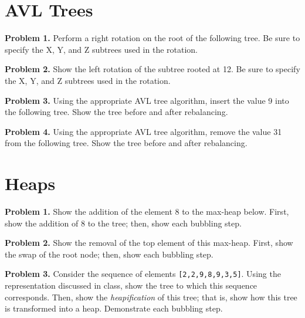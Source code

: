 \documentclass{article}
\begin{document}
\section{AVL Trees}

\noindent \textbf{Problem 1.} Perform a right rotation on the root of the following tree.  Be sure to specify the X, Y, and Z subtrees used in the rotation.


\noindent \textbf{Problem 2.} Show the left rotation of the subtree rooted at 12.  Be sure to specify the X, Y, and Z subtrees used in the rotation.



\noindent \textbf{Problem 3.} Using the appropriate AVL tree algorithm, insert the value 9 into the following tree.  Show the tree before and after rebalancing.



\noindent \textbf{Problem 4.} Using the appropriate AVL tree algorithm, remove the value 31 from the following tree.  Show the tree before and after rebalancing.



\section{Heaps}

\noindent \textbf{Problem 1.} Show the addition of the element 8 to the max-heap below.  First, show the addition of 8 to the tree; then, show each bubbling step.



\noindent \textbf{Problem 2.} Show the removal of the top element of this max-heap.  First, show the swap of the root node; then, show each bubbling step.



\noindent \textbf{Problem 3.} Consider the sequence of elements \texttt{[2,2,9,8,9,3,5]}.  Using the representation discussed in class, show the tree to which this sequence corresponds.  Then, show the \textit{heapification} of this tree; that is, show how this tree is transformed into a heap.  Demonstrate each bubbling step.


\end{document}
